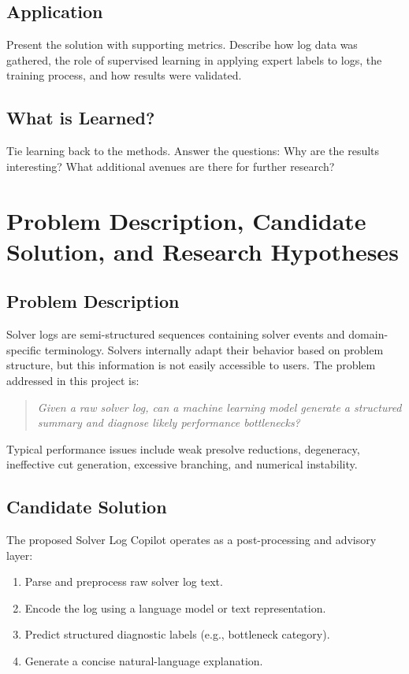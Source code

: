 \documentclass[11pt]{article}
\begin{document}
\subsection*{Application}
Present the solution with supporting metrics. Describe how log data was gathered, the role of supervised learning in applying expert labels to logs,
the training process, and how results were validated.

\subsection*{What is Learned?}
Tie learning back to the methods. Answer the questions: Why are the results interesting? What additional avenues are there for further research?

\section{Problem Description, Candidate Solution, and Research Hypotheses}

\subsection{Problem Description}

Solver logs are semi-structured sequences containing solver events and domain-specific terminology. Solvers internally adapt their behavior based on problem structure, but this information is not easily accessible to users. The problem addressed in this project is:
\begin{quote}
\emph{Given a raw solver log, can a machine learning model generate a structured summary and diagnose likely performance bottlenecks?}
\end{quote}

Typical performance issues include weak presolve reductions, degeneracy, ineffective cut generation, excessive branching, and numerical instability.

\subsection{Candidate Solution}

The proposed Solver Log Copilot operates as a post-processing and advisory layer:
\begin{enumerate}
    \item Parse and preprocess raw solver log text.
    \item Encode the log using a language model or text representation.
    \item Predict structured diagnostic labels (e.g., bottleneck category).
    \item Generate a concise natural-language explanation.
\end{enumerate}
\end{document}
